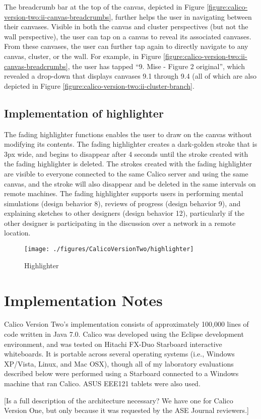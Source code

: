 The breadcrumb bar at the top of the canvas, depicted in Figure \ref{figure:calico-version-two:ii-canvas-breadcrumbs}, further helps the user in navigating between their canvases. Visible in both the canvas and cluster perspectives (but not the wall perspective), the user can tap on a canvas to reveal its associated canvases. From these canvases, the user can further tap again to directly navigate to any canvas, cluster, or the wall. For example, in Figure \ref{figure:calico-version-two:ii-canvas-breadcrumbs}, the user has tapped ``9. Mise - Figure 2 original'', which revealed a drop-down that displays canvases 9.1 through 9.4 (all of which are also depicted in Figure \ref{figure:calico-version-two:ii-cluster-branch}.

\subsection{Implementation of highlighter}

The fading highlighter functions enables the user to draw on the canvas without modifying its contents. The fading highlighter creates a dark-golden stroke that is 3px wide, and begins to disappear after 4 seconds until the stroke created with the fading highlighter is deleted. The strokes created with the fading highlighter are visible to everyone connected to the same Calico server and using the same canvas, and the stroke will also disappear and be deleted in the same intervals on remote machines. The fading highlighter supports users in performing mental simulations (design behavior 8), reviews of progress (design behavior 9), and explaining sketches to other designers (design behavior 12), particularly if the other designer is participating in the discussion over a network in a remote location.

\begin{figure*}[tbh]
  \centering
  \texttt{[image: ./figures/CalicoVersionTwo/highlighter]}
  \caption{Highlighter}
  \label{figure:calico-version-two:highlighter}
\end{figure*}

\section{Implementation Notes}

Calico Version Two's implementation consists of approximately 100,000 lines of code written in Java 7.0. Calico was developed using the Eclipse development environment, and was tested on Hitachi FX-Duo Starboard interactive whiteboards. It is portable across several operating systems (i.e., Windows XP/Vista, Linux, and Mac OSX), though all of my laboratory evaluations described below were performed using a Starboard connected to a Windows machine that ran Calico. ASUS EEE121 tablets were also used.

[Is a full description of the architecture necessary? We have one for Calico Version One, but only because it was requested by the ASE Journal reviewers.]

